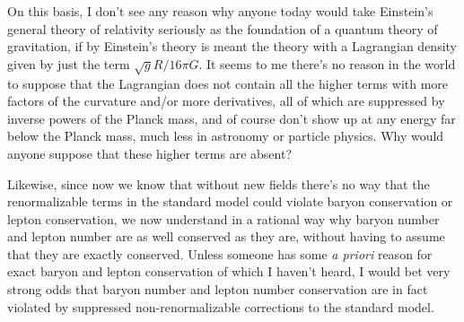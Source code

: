 On this basis, I don't see any reason why anyone today would
take Einstein's general theory of relativity seriously as
the foundation of a quantum theory of gravitation, if by
Einstein's theory is meant the theory with a Lagrangian
density given by just the term $\sqrt{g}R/16\pi G$.  It
seems to me there's no reason in the world to suppose that
the Lagrangian does not contain all the higher terms with
more factors of the curvature and/or more derivatives, all
of which are suppressed by inverse powers of the Planck
mass, and of course don't show up at any energy far below
the Planck mass, much less in astronomy or particle physics.
Why would anyone suppose that these higher terms are absent?

Likewise,  since now we know that without new fields there's
no way that the renormalizable terms in the standard model
could violate baryon conservation or lepton conservation, we
now understand in a rational way why baryon number and
lepton number are as well conserved as they are, without
having to assume that they are exactly
conserved.  Unless someone
has some {\em a priori} reason for exact baryon and lepton
conservation of which I haven't heard, I would bet very
strong odds that baryon number and lepton number
conservation are in fact violated by suppressed
non-renormalizable corrections to the standard model.

